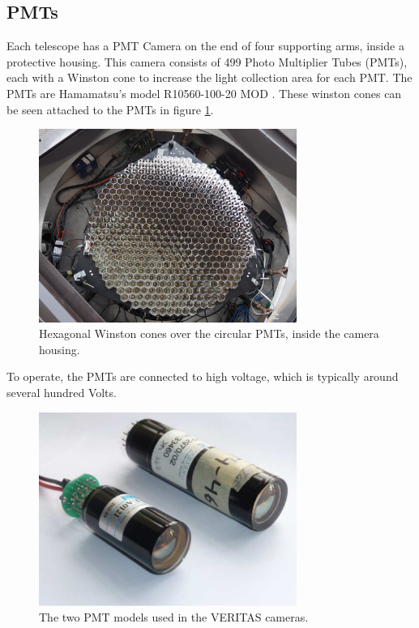 \subsection{PMTs}\label{sec:pmts}

Each telescope has a PMT Camera on the end of four supporting arms, inside a protective housing.
This camera consists of 499 Photo Multiplier Tubes (PMTs), each with a Winston cone to increase the light collection area for each PMT.
The PMTs are Hamamatsu's model R10560-100-20 MOD \cite{pmtmodels}.
These winston cones can be seen attached to the PMTs in figure \ref{fig:winstcones}.

\begin{figure}[h]
  \begin{center}
    \includegraphics[width=0.75\textwidth]{images/winston_cones_t2}
    \caption[Winston Cones]{Hexagonal Winston cones over the circular PMTs, inside the camera housing.}\label{fig:winstcones}
  \end{center}
\end{figure}

To operate, the PMTs are connected to high voltage, which is typically around several hundred Volts.

\begin{figure}[h]
  \begin{center}
    \includegraphics[width=0.75\textwidth]{images/pmt_models}
    \caption[PMT Models]{The two PMT models used in the VERITAS cameras. \cite{pmtmodels}}\label{fig:pmtmodels}
  \end{center}
\end{figure}

